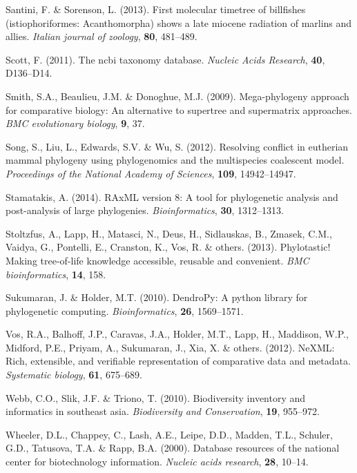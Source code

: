 \documentclass[]{article}
\begin{document}
\leavevmode\hypertarget{ref-santini2013first}{}%
Santini, F. \& Sorenson, L. (2013). First molecular timetree of billfishes (istiophoriformes: Acanthomorpha) shows a late miocene radiation of marlins and allies. \emph{Italian journal of zoology}, \textbf{80}, 481--489.

\leavevmode\hypertarget{ref-scott2011ncbi}{}%
Scott, F. (2011). The ncbi taxonomy database. \emph{Nucleic Acids Research}, \textbf{40}, D136--D14.

\leavevmode\hypertarget{ref-smith2009mega}{}%
Smith, S.A., Beaulieu, J.M. \& Donoghue, M.J. (2009). Mega-phylogeny approach for comparative biology: An alternative to supertree and supermatrix approaches. \emph{BMC evolutionary biology}, \textbf{9}, 37.

\leavevmode\hypertarget{ref-song2012resolving}{}%
Song, S., Liu, L., Edwards, S.V. \& Wu, S. (2012). Resolving conflict in eutherian mammal phylogeny using phylogenomics and the multispecies coalescent model. \emph{Proceedings of the National Academy of Sciences}, \textbf{109}, 14942--14947.

\leavevmode\hypertarget{ref-stamatakis2014raxml}{}%
Stamatakis, A. (2014). RAxML version 8: A tool for phylogenetic analysis and post-analysis of large phylogenies. \emph{Bioinformatics}, \textbf{30}, 1312--1313.

\leavevmode\hypertarget{ref-stoltzfus2013phylotastic}{}%
Stoltzfus, A., Lapp, H., Matasci, N., Deus, H., Sidlauskas, B., Zmasek, C.M., Vaidya, G., Pontelli, E., Cranston, K., Vos, R. \& others. (2013). Phylotastic! Making tree-of-life knowledge accessible, reusable and convenient. \emph{BMC bioinformatics}, \textbf{14}, 158.

\leavevmode\hypertarget{ref-sukumaran2010dendropy}{}%
Sukumaran, J. \& Holder, M.T. (2010). DendroPy: A python library for phylogenetic computing. \emph{Bioinformatics}, \textbf{26}, 1569--1571.

\leavevmode\hypertarget{ref-vos2012nexml}{}%
Vos, R.A., Balhoff, J.P., Caravas, J.A., Holder, M.T., Lapp, H., Maddison, W.P., Midford, P.E., Priyam, A., Sukumaran, J., Xia, X. \& others. (2012). NeXML: Rich, extensible, and verifiable representation of comparative data and metadata. \emph{Systematic biology}, \textbf{61}, 675--689.

\leavevmode\hypertarget{ref-webb2010biodiversity}{}%
Webb, C.O., Slik, J.F. \& Triono, T. (2010). Biodiversity inventory and informatics in southeast asia. \emph{Biodiversity and Conservation}, \textbf{19}, 955--972.

\leavevmode\hypertarget{ref-wheeler2000database}{}%
Wheeler, D.L., Chappey, C., Lash, A.E., Leipe, D.D., Madden, T.L., Schuler, G.D., Tatusova, T.A. \& Rapp, B.A. (2000). Database resources of the national center for biotechnology information. \emph{Nucleic acids research}, \textbf{28}, 10--14.
\end{document}
